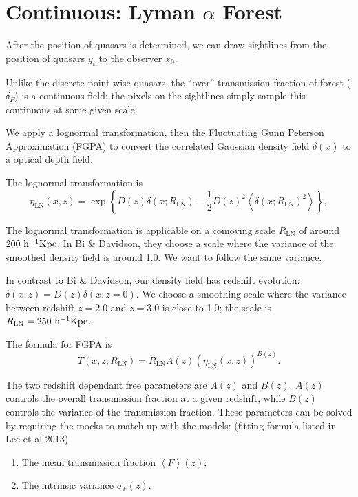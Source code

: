 \documentclass{paper}
\begin{document}
\section{Continuous: Lyman $\alpha$ Forest}
    After the position of quasars is determined, we can draw
    sightlines from the position of quasars $y_i$ 
    to the observer $x_0$. 
    
    Unlike the discrete point-wise quasars, the
    ``over'' transmission fraction of forest ($\delta_F$) is
    a continuous field; the pixels on the sightlines simply
    sample this continuous at some given scale.

    We apply a lognormal transformation, then the Fluctuating Gunn Peterson
    Approximation (FGPA) to convert the correlated Gaussian density
    field $\delta(x)$ to a optical depth field.

    The lognormal transformation is 
    \[
        \eta_\mathrm{LN}(x, z) = \exp\left\{
        D(z) \delta(x; R_\mathrm{LN}) - \frac{1}{2} D(z)^2
        \left<\delta(x; R_\mathrm{LN})^2\right> 
        \right\},
    \]

    The lognormal transformation is applicable on a comoving
    scale $R_\mathrm{LN}$ of around $200\,\kpch$. In
    Bi \& Davidson, they choose a scale where the variance of the smoothed density field 
    is around 1.0. We want to follow the
    same variance. 
    
    In contrast to Bi \& Davidson, our density field has redshift 
    evolution: $\delta(x; z) = D(z) \delta(x; z=0)$. We choose a 
    smoothing scale where the variance between redshift $z=2.0$ 
    and $z=3.0$ is close to 1.0; the scale is $R_\mathrm{LN} =
    250\,\kpch$.

    The formula for FGPA is
    \[
        T(x, z; R_\mathrm{LN}) = 
          R_\mathrm{LN} A(z) 
            \left(\eta_\mathrm{LN}(x,
          z)\right) ^ {B(z)}.
    \]

    The two redshift dependant free parameters are $A(z)$
    and $B(z)$. $A(z)$ controls the overall transmission
    fraction at a given redshift, while $B(z)$ controls
    the variance of the transmission fraction. These
    parameters can be solved by requiring the mocks to match
    up with the models: (fitting formula listed in Lee et al 2013)

    \begin{enumerate}
        \item The mean transmission fraction $\left<F\right>(z)$;
        \item The intrinsic variance $\sigma_F(z)$.
    \end{enumerate}
\end{document}
